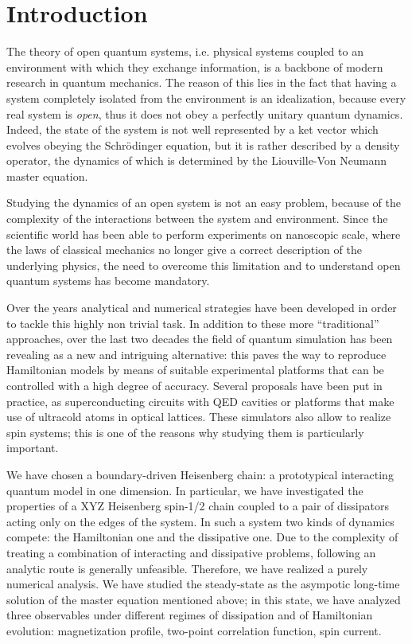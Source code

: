 \chapter*{Introduction}
\label{Introduction}

The theory of open quantum systems, i.e. physical systems coupled to an environment with which they exchange information, is a backbone of modern research in quantum mechanics. The reason of this lies in the fact that having a system completely isolated from the environment is an idealization, because every real system is \emph{open}, thus it does not obey a perfectly unitary quantum dynamics. Indeed, the state of the system is not well represented by a ket vector which evolves obeying the Schr\"{o}dinger equation, but it is rather described by a density operator, the dynamics of which is determined by the Liouville-Von Neumann master equation.

Studying the dynamics of an open system is not an easy problem, because of the complexity of the interactions between the system and environment. Since the scientific world has been able to perform experiments on nanoscopic scale, where the laws of classical mechanics no longer give a correct description of the underlying physics, the need to overcome this limitation and to understand open quantum systems has become mandatory.

Over the years analytical and numerical strategies have been developed in order to tackle this highly non trivial task. In addition to these more ``traditional'' approaches, over the last two decades the field of quantum simulation has been revealing as a new and intriguing alternative: this paves the way to reproduce Hamiltonian models by means of suitable experimental platforms that can be controlled with a high degree of accuracy. Several proposals have been put in practice, as superconducting circuits with QED cavities or platforms that make use of ultracold atoms in optical lattices. These simulators also allow to realize spin systems; this is one of the reasons why studying them is particularly important.

We have chosen a boundary-driven Heisenberg chain: a prototypical interacting quantum model in one dimension. In particular, we have investigated the properties of a XYZ Heisenberg spin-1/2 chain coupled to a pair of dissipators acting only on the edges of the system. In such a system two kinds of dynamics compete: the Hamiltonian one and the dissipative one. Due to the complexity of treating a combination of interacting and dissipative problems, following an analytic route is generally unfeasible. Therefore, we have realized a purely numerical analysis. We have studied the steady-state as the asympotic long-time solution of the master equation mentioned above; in this state, we have analyzed three observables under different regimes of dissipation and of Hamiltonian evolution: magnetization profile, two-point correlation function, spin current.

